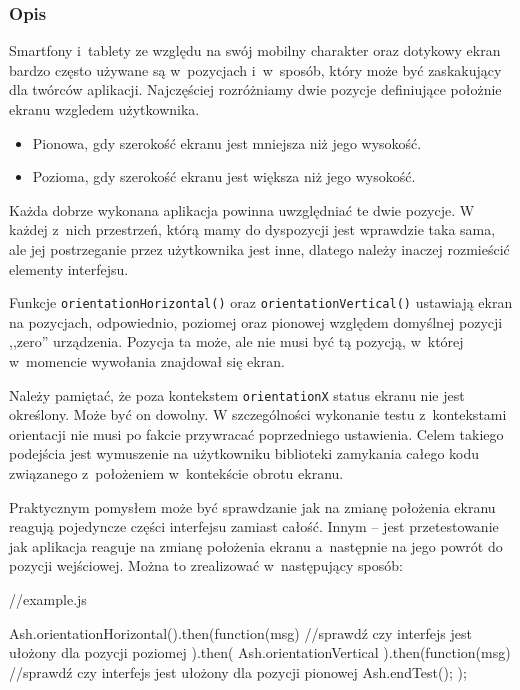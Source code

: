 \documentclass[brudnopis]{xmgr}
\begin{document}
\subsubsection{Opis}

Smartfony i~tablety ze względu na swój mobilny charakter oraz dotykowy ekran bardzo często używane są w~pozycjach i~w~sposób, który może być zaskakujący dla twórców aplikacji. Najczęściej rozróżniamy dwie pozycje definiujące położnie ekranu wzgledem użytkownika. 

\begin{itemize}
  \item Pionowa, gdy szerokość ekranu jest mniejsza niż jego wysokość.
  \item Pozioma, gdy szerokość ekranu jest większa niż jego wysokość.
\end{itemize}

Każda dobrze wykonana aplikacja powinna uwzględniać te dwie pozycje. W każdej z~nich przestrzeń, którą mamy do dyspozycji jest wprawdzie taka sama, ale jej postrzeganie przez użytkownika jest inne, dlatego należy inaczej rozmieścić elementy interfejsu.  

Funkcje \texttt{orientationHorizontal()} oraz \texttt{orientationVertical()} ustawiają ekran na pozycjach, odpowiednio, poziomej oraz pionowej względem domyślnej pozycji ,,zero'' urządzenia. Pozycja ta może, ale nie musi być tą pozycją, w~której w~momencie wywołania znajdował się ekran.  

Należy pamiętać, że poza kontekstem \texttt{orientationX} status ekranu nie jest określony. Może być on dowolny. W szczególności wykonanie testu z~kontekstami orientacji nie musi po fakcie przywracać poprzedniego ustawienia. Celem takiego podejścia jest wymuszenie na użytkowniku biblioteki zamykania całego kodu związanego z~położeniem w~kontekście obrotu ekranu. 

Praktycznym pomysłem może być sprawdzanie jak na zmianę położenia ekranu reagują pojedyncze części interfejsu zamiast całość. Innym -- jest przetestowanie jak aplikacja reaguje na zmianę położenia ekranu a~następnie na jego powrót do pozycji wejściowej. Można to zrealizować w~następujący sposób:

\begin{javascriptcode}
  //example.js

  Ash.orientationHorizontal().then(function(msg){
    //sprawdź czy interfejs jest ułożony dla pozycji poziomej
  }).then(
      Ash.orientationVertical
  ).then(function(msg){
    //sprawdź czy interfejs jest ułożony dla pozycji pionowej
    Ash.endTest();
  });
\end{javascriptcode}
\end{document}
